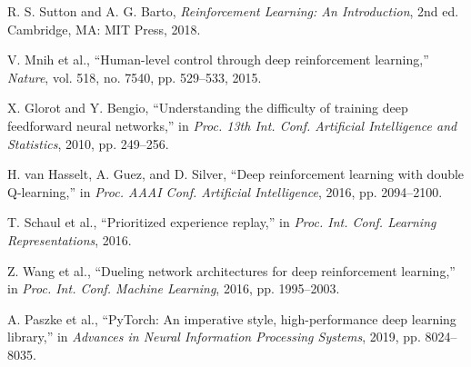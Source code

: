 \documentclass[conference]{IEEEtran}
\begin{document}
\begin{thebibliography}{00}
 R. S. Sutton and A. G. Barto, \textit{Reinforcement Learning: An Introduction}, 2nd ed. Cambridge, MA: MIT Press, 2018.

 V. Mnih et al., ``Human-level control through deep reinforcement learning,'' \textit{Nature}, vol. 518, no. 7540, pp. 529--533, 2015.

 X. Glorot and Y. Bengio, ``Understanding the difficulty of training deep feedforward neural networks,'' in \textit{Proc. 13th Int. Conf. Artificial Intelligence and Statistics}, 2010, pp. 249--256.

 H. van Hasselt, A. Guez, and D. Silver, ``Deep reinforcement learning with double Q-learning,'' in \textit{Proc. AAAI Conf. Artificial Intelligence}, 2016, pp. 2094--2100.

 T. Schaul et al., ``Prioritized experience replay,'' in \textit{Proc. Int. Conf. Learning Representations}, 2016.

 Z. Wang et al., ``Dueling network architectures for deep reinforcement learning,'' in \textit{Proc. Int. Conf. Machine Learning}, 2016, pp. 1995--2003.

 A. Paszke et al., ``PyTorch: An imperative style, high-performance deep learning library,'' in \textit{Advances in Neural Information Processing Systems}, 2019, pp. 8024--8035.

\end{thebibliography}
\end{document}
